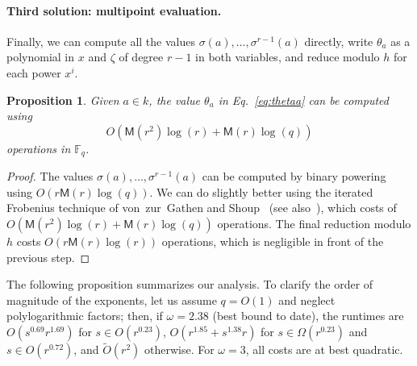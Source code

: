 \documentclass{mcom-l}
\theoremstyle{plain}
\newtheorem{proposition}[theorem]{Proposition}
\theoremstyle{definition}
\newcommand{\tildO}{\tilde{O}}
\newcommand{\F}{\ensuremath{\mathbb{F}}}
\newcommand{\MM}{\ensuremath{\mathsf{M}}}
\newcounter{algorithm}
\begin{document}
\paragraph{\bf Third solution: multipoint evaluation.}
Finally, we can compute all the values
$\sigma(a),\dots,\sigma^{r-1}(a)$ directly, write $\theta_a$ as a
polynomial in $x$ and $\zeta$ of degree $r-1$ in both variables, and
reduce modulo $h$ for each power $x^i$.

\begin{proposition}
  \label{prop:iter-frob-theta}
  Given $a\in k$, the value $\theta_a$ in Eq.~\eqref{eq:thetaa} can
  be computed using 
  \[
O(\MM(r^2)\log(r) + \MM(r)\log(q))
\] operations in
  $\F_q$.
\end{proposition}
\begin{proof}
  The values $\sigma(a),\dots,\sigma^{r-1}(a)$ can be computed by
  binary powering using $O(r\MM(r)\log(q))$. %
  We can do slightly better using the iterated Frobenius technique of
  von~zur~Gathen and Shoup~\cite[Algorithm~3.1]{von1992computing} (see
  also~\cite[Ch.~14.7]{vzGG}), which costs of
  $O(\MM(r^2)\log(r) + \MM(r)\log(q))$ operations. %
  The final reduction modulo $h$ costs $O(r\MM(r)\log(r))$ operations,
  which is negligible in front of the previous step.
\end{proof}


The following proposition summarizes our analysis. To clarify the
order of magnitude of the exponents, let us assume $q=O(1)$ and
neglect polylogarithmic factors; then, if $\omega=2.38$ (best bound to
date), the runtimes are $O(s^{0.69}r^{1.69})$ for $s \in O(r^{0.23})$,
$O(r^{1.85}+s^{1.38}r)$ for $s \in \Omega(r^{0.23})$ and $s\in
O(r^{0.72})$, and $\tildO(r^2)$ otherwise.
For $\omega=3$, all costs are at best quadratic.
\end{document}
